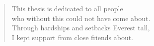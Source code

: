 \begin{verse}
This thesis is dedicated to all people\\
who without this could not have come about.\\
Through hardships and setbacks Everest tall,\\
I kept support from close friends about.

\end{verse}
